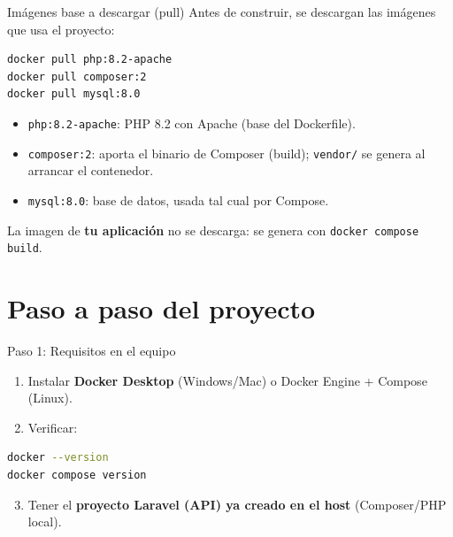 \documentclass[aspectratio=169,10pt]{beamer}
\begin{document}
\begin{frame}[fragile]{Imágenes base a descargar (pull)}
  Antes de construir, se descargan las imágenes que usa el proyecto:
\begin{lstlisting}[language=bash]
docker pull php:8.2-apache
docker pull composer:2
docker pull mysql:8.0
\end{lstlisting}
  \vspace{0.3em}
  \begin{itemize}
    \item \texttt{php:8.2-apache}: PHP 8.2 con Apache (base del Dockerfile).
    \item \texttt{composer:2}: aporta el binario de Composer (build); \texttt{vendor/} se genera al arrancar el contenedor.
    \item \texttt{mysql:8.0}: base de datos, usada tal cual por Compose.
  \end{itemize}
  \vspace{0.2em}
  \small La imagen de \textbf{tu aplicación} no se descarga: se genera con \texttt{docker compose build}.
\end{frame}

\section{Paso a paso del proyecto}

\begin{frame}[fragile]{Paso 1: Requisitos en el equipo}
  \begin{enumerate}
    \item Instalar \textbf{Docker Desktop} (Windows/Mac) o Docker Engine + Compose (Linux).
    \item Verificar:
  \end{enumerate}
\begin{lstlisting}[language=bash]
docker --version
docker compose version
\end{lstlisting}
  \begin{enumerate}
    \setcounter{enumi}{2}
    \item Tener el \textbf{proyecto Laravel (API) ya creado en el host} (Composer/PHP local).
  \end{enumerate}
\end{frame}
\end{document}
